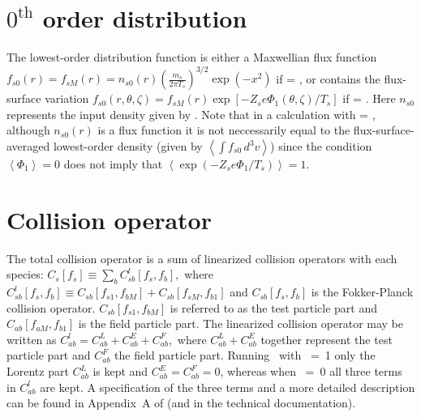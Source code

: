 

\section{$0^{\mathrm{th}}$ order distribution}
The lowest-order distribution function is either a Maxwellian flux function $\displaystyle f_{s0}\left(r\right) = f_{sM}\left(r\right) = n_{s 0}\left(r\right) \left(\frac{m_s}{2 \pi T_s}\right)^{3/2} \exp \left(- x^2\right)$ if  = \false, 
or contains the flux-surface variation $\displaystyle f_{s0}\left(r,\theta,\zeta\right) = f_{sM}\left(r\right) \exp \left[- Z_s e \Phi_1(\theta,\zeta) / T_s \right]$ if  = \true. 
Here $n_{s 0}$ represents the input density given by . 
Note that in a calculation with  = \true, although $n_{s 0}\left(r\right)$ is a flux function it is not neccessarily equal to the flux-surface-averaged lowest-order density (given by $\left\langle \int f_{s 0} \, d^3v \right\rangle$) since the condition $\displaystyle \left\langle \Phi_1 \right\rangle = 0$ does not imply that $\displaystyle \left\langle \exp \left(- Z_s e \Phi_1 / T_s \right) \right\rangle = 1$.

\section{Collision operator}
\label{sec:CollisionOperator}
The total collision operator is a sum of linearized collision operators with each species: 
$ \displaystyle
C_s\left[f_s\right] \equiv \sum_b C_{s b}^{l}\left[f_s, f_b\right],
$
where 
$ \displaystyle
C_{sb}^{l}\left[f_s, f_b\right] \equiv C_{s b}\left[f_{s 1}, f_{b M}\right] + C_{s b}\left[f_{s M}, f_{b 1}\right]
$
and $C_{s b}\left[f_{s}, f_{b}\right]$ is the Fokker-Planck collision operator. 
$C_{s b}\left[f_{s 1}, f_{b M}\right]$ %
is referred to as the test particle part 
and $C_{a b}\left[f_{a M}, f_{b 1}\right]$ is the field particle part.
The linearized collision operator may be written as 
$ \displaystyle
C_{a b}^{l} = C_{a b}^{L} + C_{a b}^{E} + C_{a b}^{F},
$
where $C_{a b}^{L} + C_{a b}^{E}$ together represent the test particle part and $C_{a b}^{F}$ the field particle part. 
Running \sfincs~with ~=~1 only the Lorentz part $C_{a b}^{L}$ is kept and $C_{a b}^{E} = C_{a b}^{F} = 0$, 
whereas when ~=~0 all three terms in $C_{a b}^{l}$ are kept. 
A specification of the three terms and a more detailed description can be found in Appendix~A of \cite{Mollen2015} (and in the technical documentation). 

